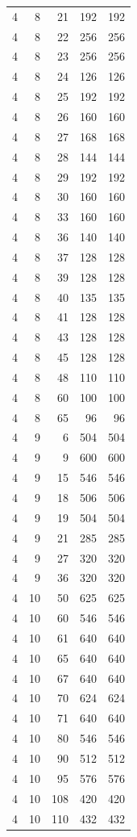 \begin{longtable}{rrrrr}
4 & 8 & 21 & 192 & 192 \\
4 & 8 & 22 & 256 & 256 \\
4 & 8 & 23 & 256 & 256 \\
4 & 8 & 24 & 126 & 126 \\
4 & 8 & 25 & 192 & 192 \\
4 & 8 & 26 & 160 & 160 \\
4 & 8 & 27 & 168 & 168 \\
4 & 8 & 28 & 144 & 144 \\
4 & 8 & 29 & 192 & 192 \\
4 & 8 & 30 & 160 & 160 \\
4 & 8 & 33 & 160 & 160 \\
4 & 8 & 36 & 140 & 140 \\
4 & 8 & 37 & 128 & 128 \\
4 & 8 & 39 & 128 & 128 \\
4 & 8 & 40 & 135 & 135 \\
4 & 8 & 41 & 128 & 128 \\
4 & 8 & 43 & 128 & 128 \\
4 & 8 & 45 & 128 & 128 \\
4 & 8 & 48 & 110 & 110 \\
4 & 8 & 60 & 100 & 100 \\
4 & 8 & 65 & 96 & 96 \\
4 & 9 & 6 & 504 & 504 \\
4 & 9 & 9 & 600 & 600 \\
4 & 9 & 15 & 546 & 546 \\
4 & 9 & 18 & 506 & 506 \\
4 & 9 & 19 & 504 & 504 \\
4 & 9 & 21 & 285 & 285 \\
4 & 9 & 27 & 320 & 320 \\
4 & 9 & 36 & 320 & 320 \\
4 & 10 & 50 & 625 & 625 \\
4 & 10 & 60 & 546 & 546 \\
4 & 10 & 61 & 640 & 640 \\
4 & 10 & 65 & 640 & 640 \\
4 & 10 & 67 & 640 & 640 \\
4 & 10 & 70 & 624 & 624 \\
4 & 10 & 71 & 640 & 640 \\
4 & 10 & 80 & 546 & 546 \\
4 & 10 & 90 & 512 & 512 \\
4 & 10 & 95 & 576 & 576 \\
4 & 10 & 108 & 420 & 420 \\
4 & 10 & 110 & 432 & 432 \\
\bottomrule\end{longtable}
